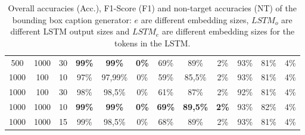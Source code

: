\begin{table}[ht]
\begin{tabular}{ccc|ccc|ccc|ccc}
        {500}  & {1000}   & {30}     & \textbf{99\%}                       & \textbf{99\%}                       & \textbf{0\%}                             & {69\%}        & {89\%}          & {2\%}        & {93\%}        & {81\%}        & {4\%}        \\
        {1000} & {100}    & {10}     & {97\%}                              & {97,99\%}                           & {0\%}                                    & {59\%}        & {85,5\%}        & {2\%}        & {93\%}        & {81\%}        & {4\%}        \\
        {1000} & {100}    & {30}     & {98\%}                              & {98,5\%}                            & {0\%}                                    & {61\%}        & {87\%}          & {2\%}        & {92\%}        & {81\%}        & {4\%}        \\
        {1000} & {1000}   & {10}     & \textbf{99\%}                       & \textbf{99\%}                       & \textbf{0\%}                             & \textbf{69\%} & \textbf{89,5\%} & \textbf{2\%} & {93\%}        & {82\%}        & {4\%}        \\
        {1000} & {1000}   & {15}     & {99\%}                              & {98,5\%}                            & {0\%}                                    & {68\%}        & {89\%}          & {2\%}        & {93\%}        & {81\%}        & {4\%}        \\
        \bottomrule
    \end{tabular}
    \caption{Overall accuracies (Acc.), F1-Score (F1) and non-target accuracies (NT) of the bounding box caption generator: $e$ are different embedding sizes, $LSTM_o$ are different LSTM output sizes and $LSTM_e$ are different embedding sizes for the tokens in the LSTM.}
    \label{tab:results_bounding-box-caption-generator}
\end{table}

